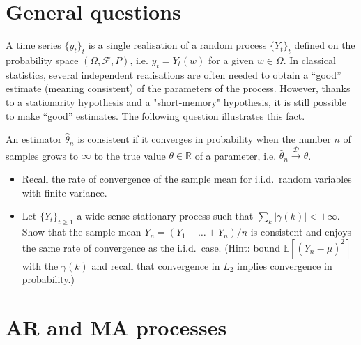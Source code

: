 \documentclass[11pt]{article}
\begin{document}
\section{General questions}

A time series $\{y_t\}_t$ is a single realisation of a random process $\{Y_t\}_t$ defined on the probability space $(\Omega, \mathcal{F}, P)$, i.e. $y_t = Y_t(w)$ for a given $w\in\Omega$.
In classical statistics, several independent realisations are often needed to obtain a ``good'' estimate (meaning consistent) of the parameters of the process.
However, thanks to a stationarity hypothesis and a "short-memory" hypothesis, it is still possible to make ``good'' estimates.
The following question illustrates this fact.

\begin{exercise}
An estimator $\hat{\theta}_n$ is consistent if it converges in probability when the number $n$ of samples grows to $\infty$ to the true value $\theta\in\mathbb{R}$ of a parameter, i.e. $\hat{\theta}_n \xrightarrow{\mathcal{D}} \theta$.

\begin{itemize}
    \item Recall the rate of convergence of the sample mean for i.i.d.\ random variables with finite variance.
    \item Let $\{Y_t\}_{t\geq 1}$ a wide-sense stationary process such that $\sum_k |\gamma (k)| < +\infty$. 
    Show that the sample mean $\bar{Y}_n = (Y_1+\dots+Y_n)/n$ is consistent and enjoys the same rate of convergence as the i.i.d.\ case. (Hint: bound $\mathbb{E}[(\bar{Y}_n-\mu)^2]$ with the $\gamma (k)$ and recall that convergence in $L_2$ implies convergence in probability.)
\end{itemize}

\end{exercise}

\begin{solution}  %


\end{solution}


\newpage
\section{AR and MA processes}
\end{document}
